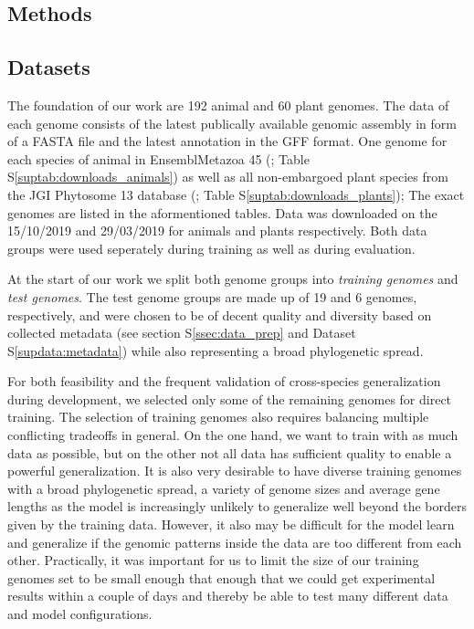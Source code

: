 \documentclass{bioinfo}
\newcounter{suptab}
\newcounter{supdata}
\begin{document}
\begin{methods}
\section{Methods}
\subsection{Datasets}
The foundation of our work are 192 animal and 60 plant genomes. The data of each 
genome consists of the latest publically available genomic assembly in form of a 
FASTA file and the latest annotation in the GFF format. One genome for each species of animal 
in EnsemblMetazoa 45 (\cite{howe2020ensembl}; Table S\ref{suptab:downloads_animals}) 
as well as all non-embargoed plant species from the JGI Phytosome 13 database 
(\cite{goodstein2012phytozome}; Table S\ref{suptab:downloads_plants}); The exact 
genomes are listed in the aformentioned tables.
Data was downloaded on the 15/10/2019 and 29/03/2019 for animals and plants respectively. 
Both data groups were used seperately during training as well as during evaluation. 

At the start of our work we split both genome groups into {\it training genomes} and 
{\it test genomes}. The test genome groups are made up of 19 and 6 genomes, 
respectively, and were chosen to be of decent quality and diversity based on collected 
metadata (see section S\ref{ssec:data_prep} and Dataset S\ref{supdata:metadata}) 
while also representing a broad phylogenetic spread. 

For both feasibility and the frequent validation of cross-species generalization during
development, we
selected only some of the remaining genomes for direct training.
The selection of training genomes also requires balancing multiple conflicting 
tradeoffs in general. On the one hand, we want to train with as much data as possible, but 
on the other
not all data has sufficient quality to enable a powerful generalization. It is 
also very desirable to have diverse training genomes with a broad phylogenetic spread, 
a variety of genome sizes and average gene lengths as the model is increasingly unlikely to generalize 
well beyond the borders given by the training data. However, it also may be difficult 
for the model learn and generalize if the genomic patterns inside the data are 
too different from each other. Practically, it was important for us to limit the size of
our training genomes set to be small enough that enough that we could get experimental 
results within a couple of days and thereby be able to test many different data and 
model configurations.


\end{methods}
\end{document}
